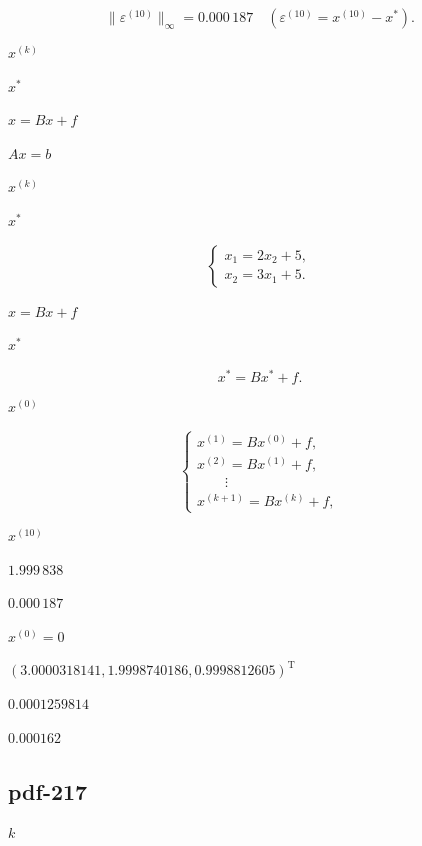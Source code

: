 \documentclass[UTF8,fontset=fandol]{ctexart}
\begin{document}
\[
\|\varepsilon^{(10)}\|_\infty=0.000\,187\quad(\varepsilon^{(10)}=x^{(10)}-x^*).
\]

$x^{(k)}$\par

$x^*$\par

$x=Bx+f$\par

$Ax=b$\par

$x^{(k)}$\par

$x^*$\par

\[
\begin{cases}
x_1=2x_2+5,\\
x_2=3x_1+5.
\end{cases}
\]

$x=Bx+f$\par

$x^*$\par

\[
x^*=Bx^*+f.
\tag{8.1.5}
\]

$x^{(0)}$\par

\[
\begin{cases}
x^{(1)}=Bx^{(0)}+f,\\
x^{(2)}=Bx^{(1)}+f,\\
\qquad\vdots\\
x^{(k+1)}=Bx^{(k)}+f,
\end{cases}
\tag{8.1.6}
\]

$x^{(10)}$\par

$1.999\,838$\par

$0.000\,187$\par

$x^{(0)}=0$\par

$(3.0000318141,1.9998740186,0.9998812605)^{\mathrm T}$\par

$0.0001259814$\par

$0.000162$\par

\subsection*{pdf-217}

$k$\par
\end{document}
